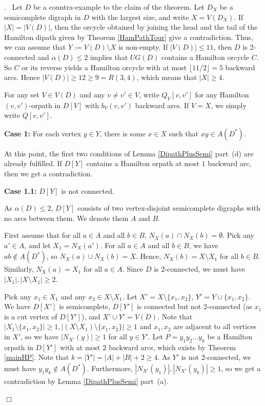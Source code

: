 \documentclass{article}
\newcommand{\2}{\vspace{2mm}}
\renewenvironment{proof}[1][]{\par \noindent {\bf Proof#1}.\ }{\hfill$\Box$
\par \vspace{11pt}}
\theoremstyle{definition}
\begin{document}
\begin{proof}
Let $D$ be a countra-example to the claim of the theorem.
Let $D_X$ be a semicomplete digraph in $D$ with the largest size, and write $X=V(D_X)$. If $|X|=|V(D)|$, then the orcycle obtained by joining the head and the tail of the Hamilton dipath given by Theorem \ref{HamPathTour} give a contradiction. Thus, we can assume that $ Y:= V(D) \setminus X$ is non-empty. 
If $|V(D)| \le 11$, then $D$ is 2-connected and $\alpha(D) \le 2$ implies that $UG(D)$ contains a Hamilton orcycle $C$. So $C$ or its reverse yields a Hamilton orcycle with at most $\lfloor 11/2 \rfloor=5$ backward arcs.
Hence $|V(D)| \ge 12 \ge 9=R(3,4)$, which means that $|X|\ge 4$.

For any set $V \in V(D)$ and any $v \neq v' \in V$, write $Q_V[v,v']$ for any Hamilton $(v,v')$-orpath in $D[V]$ with $b_V(v,v')$ backward arcs. If $V=X$, we simply write $Q[v,v']$.

\textbf{Case 1:} For each vertex $y \in Y$, there is some $x \in X$ such that $xy \in A(D^*)$. 

At this point, the first two conditions of Lemma \ref{DipathPlusSemi} part~(d) are already fulfilled. If $D[Y]$ contains a Hamilton orpath at most $1$ backward arc, then we get a contradiction.

\textbf{Case 1.1:} $D[Y]$ is not connected. 

As $\alpha(D) \le 2$, $D[Y]$ consists of two vertex-disjoint semicomplete digraphs with no arcs between them. We denote them $A$ and $B$. 

First assume that for all $a \in A$ and all $b \in B$, $N_X(a)\cap N_X(b)= \emptyset$. Pick any $a'\in A$, and let $X_1= N_X(a')$.
For all $a \in A $ and all $b \in B$, we have $ab \notin A(D^*)$, so $N_X(a)\cup N_X(b) = X$. Hence, $N_X(b) = X \setminus X_1$ for all $b \in B$. Similarly, $N_X(a)= X_1$ for all $a \in A$. Since $D$ is 2-connected, we must have $|X_1|, |X \setminus X_1| \ge 2$.

Pick any $x_1 \in X_1$ and any $x_2 \in X \setminus X_1$.
Let $X'=X \setminus \{x_1,x_2\}$, $Y'=Y\cup\{x_1,x_2\}$. We have $D[X']$ is semicomplete, $D[Y']$ is connected but not 2-connected (as $x_1$ is a cut vertex of $D[Y']$), and $X' \cup Y'=V(D)$. Note that $|X_1 \setminus \{x_1,x_2\}| \ge 1, |(X \setminus X_1) \setminus \{x_1,x_2\}| \ge 1$ and $x_1, x_2$ are adjacent to all vertices in $X'$, so we have $|N_{X'}(y)| \ge 1$ for all $y \in Y'$. Let $P=y_1y_2\dots y_k$ be a Hamilton orpath in $D[Y']$ with at most $2$ backward arcs, which exists by Theorem \ref{mainHP}. Note that $k=|Y'|=|A|+|B|+2 \ge 4$. As $Y'$ is not 2-connected, we must have $y_1y_k \notin A(D^*)$. Furthermore, $|N_{X'}(y_1)|,|N_{X'}(y_k)| \ge 1$, so we get a contradiction by Lemma \ref{DipathPlusSemi} part~(a).


\end{proof}
\end{document}
